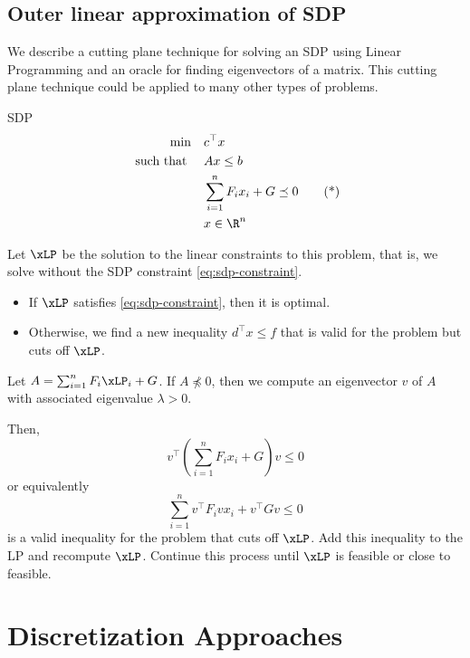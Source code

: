 \section{Outer linear approximation of SDP}
We describe a cutting plane technique for solving an SDP using Linear Programming and an oracle for finding eigenvectors of a matrix.   This cutting plane technique could be applied to many other types of problems.

\begin{general}{SDP}{}
\begin{align*}
\min  \quad & c^\top x\\
\text{ such that } \quad & Ax \leq b\\
& \sum_{i=1}^n F_i x_i + G \preceq 0 \tag{*} \label{eq:sdp-constraint}\\
&x \in \R^n
\end{align*}
\end{general}

Let $\xLP$ be the solution to the linear constraints to this problem, that is, we solve without the SDP constraint \eqref{eq:sdp-constraint}.  
\begin{itemize}
\item If $\xLP$ satisfies \eqref{eq:sdp-constraint}, then it is optimal.
\item Otherwise, we find a new inequality $d^\top x \leq f$ that is valid for the problem but cuts off $\xLP$.
\end{itemize}

Let $A  =  \sum_{i=1}^n F_i \xLP_i + G$.  If $A \not\preceq 0$, then we compute an eigenvector $v$ of $A$ with associated eigenvalue $\lambda > 0$.  

Then, 
\begin{equation}
v^\top \left( \sum_{i=1}^n F_i x_i + G\right)v \leq 0
\end{equation}
or equivalently
\begin{equation}
 \sum_{i=1}^nv^\top  F_iv x_i + v^\top Gv \leq 0
\end{equation}
is a valid inequality for the problem that cuts off $\xLP$.  Add this inequality to the LP and recompute $\xLP$.  Continue this process until $\xLP$ is feasible or close to feasible.

\chapter{Discretization Approaches}

